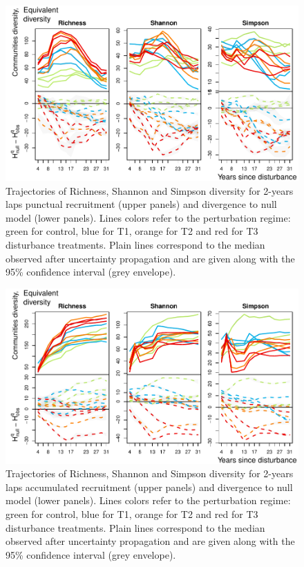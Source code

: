 \documentclass[fleqn,10pt]{ArtEcoFoG} %
\begin{document}
\begin{figure}

{\centering \includegraphics[width=0.8\linewidth]{RecruitmentTrajectories_files/figure-latex/Fig1-1} 

}

\caption{Trajectories of Richness, Shannon and Simpson diversity for 2-years laps punctual  recruitment (upper panels) and divergence to null model (lower panels). Lines colors refer to the perturbation regime: green for control, blue for T1, orange for T2 and red for T3 disturbance treatments. Plain lines correspond to the median observed after uncertainty propagation and are given along with the 95\% confidence interval (grey envelope).}\label{fig:Fig1}
\end{figure}

\begin{figure}

{\centering \includegraphics[width=0.8\linewidth]{RecruitmentTrajectories_files/figure-latex/Fig2-1} 

}

\caption{Trajectories of Richness, Shannon and Simpson diversity for 2-years laps accumulated recruitment (upper panels) and divergence to null model (lower panels). Lines colors refer to the perturbation regime: green for control, blue for T1, orange for T2 and red for T3 disturbance treatments. Plain lines correspond to the median observed after uncertainty propagation and are given along with the 95\% confidence interval (grey envelope).}\label{fig:Fig2}
\end{figure}
\end{document}
